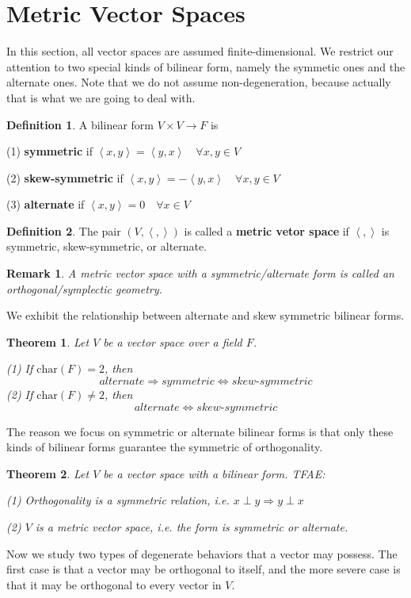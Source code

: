 \documentclass{book}
\newtheorem{theorem}{Theorem}[section]
\newtheorem*{remark}{Remark}
\theoremstyle{definition}
\newtheorem{definition}{Definition}[section]
\begin{document}
\section{Metric Vector Spaces}
In this section, all vector spaces are assumed finite-dimensional. We restrict our attention to two special kinds of bilinear form, namely the symmetic ones and the alternate ones. Note that we do not assume non-degeneration, because actually that is what we are going to deal with.
\begin{definition}
A bilinear form $V\times V\to F$ is \par
(1) \textbf{symmetric} if $\left\langle x,y\right\rangle = \left\langle y,x \right\rangle\quad\forall x,y\in V$\par
(2) \textbf{skew-symmetric} if $\left\langle x,y\right\rangle =- \left\langle y,x \right\rangle\quad\forall x,y\in V$\par
(3) \textbf{alternate} if $\left\langle x,y\right\rangle = 0\quad\forall x\in V$
\end{definition}
\begin{definition}
The pair $(V,\left\langle ,\right\rangle)$ is called a \textbf{metric vetor space} if $\left\langle ,\right\rangle$ is symmetric, skew-symmetric, or alternate.
\end{definition}
\begin{remark}
A metric vector space with a symmetric/alternate form is called an orthogonal/symplectic geometry. 
\end{remark}
We exhibit the relationship between alternate and skew symmetric bilinear forms.
\begin{theorem}
Let $V$ be a vector space over a field $F$.\par
(1) If $\text{char}(F)=2$, then \[alternate\Longrightarrow symmetric \Longleftrightarrow skew\text{-}symmetric\]
(2) If $\text{char}(F)\ne2$, then \[alternate\Longleftrightarrow skew\text{-}symmetric\]
\end{theorem}
The reason we focus on symmetric or alternate bilinear forms is that only these kinds of bilinear forms guarantee the symmetric of orthogonality.
\begin{theorem}
Let $V$ be a vector space with a bilinear form. TFAE:\par
(1) Orthogonality is a symmetric relation, i.e. $x\perp y\Longrightarrow y\perp x$\par
(2) $V$ is a metric vector space, i.e. the form is symmetric or alternate.
\end{theorem}
Now we study two types of degenerate behaviors that a vector may possess. The first case is that a vector may be orthogonal to itself, and the more severe case is that it may be orthogonal to every vector in $V$.
\end{document}
